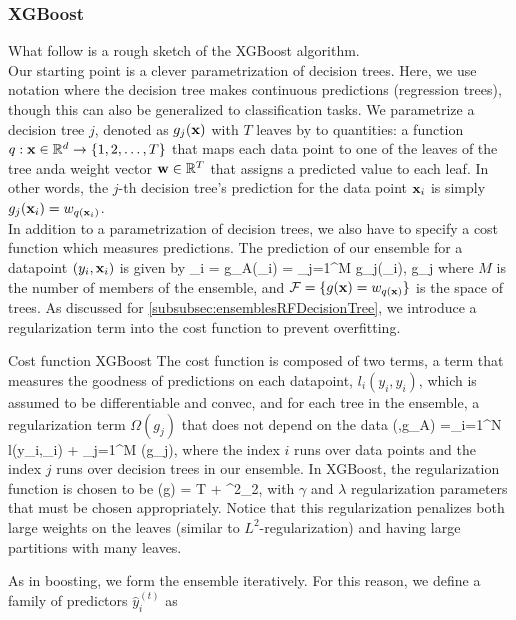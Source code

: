 \subsubsection{XGBoost}
\label{subsubsec:ensemblesXGBoost}
What follow is a rough sketch of the XGBoost algorithm.\\
Our starting point is a clever parametrization of decision trees. Here, we use notation where the decision tree makes continuous predictions (regression trees), though this can also be generalized to classification tasks. We parametrize a decision tree $j$, denoted as $g_j(\mathbf{x})$ with $T$ leaves by to quantities: a function $q: \mathbf{x} \in \mathbb{R}^d \rightarrow \{1,2,\dots, T\}$ that maps each data point to one of the leaves of the tree anda weight vector $\mathbf{w} \in \mathbb{R}^T$ that assigns a predicted value to each leaf. In other words, the $j$-th decision tree's prediction for the data point $\mathbf{x}_i$ is simply $g_j(\mathbf{x}_i) = w_{q(\mathbf{x}_i)}$.\\
In addition to a parametrization of decision trees, we also have to specify a cost function which measures predictions. The prediction of our ensemble for a datapoint $(y_i,\mathbf{x}_i)$ is given by
\bse 
{}_i = g_A(\mx_i) = \sum_{j=1}^M g_j(\mx_i), \quad g_j \in {} 
\ese 
where $M$ is the number of members of the ensemble, and $\mathcal{F}=\{g(\mathbf{x}) = w_{q(\mathbf{x})} \}$ is the space of trees. As discussed for \ref{subsubsec:ensemblesRFDecisionTree}, we introduce a regularization term into the cost function to prevent overfitting.
\begin{mybox}{Cost function XGBoost}
	The cost function is composed of two terms, a term that measures the goodness of predictions on each datapoint, $l_i(y_i,\hat{y}_i)$, which is assumed to be differentiable and convec, and for each tree in the ensemble, a regularization term $\Omega(g_j)$ that does not depend on the data 
	\be 
	\label{eq:ensemblesXGBoostCostfct}
	\mC (\mX,g_A) =\sum_{i=1}^N l(y_i,_i) + \sum_{j=1}^M \Omega(g_j),
	\ee 
	where the index $i$ runs over data points and the index $j$ runs over decision trees in our ensemble. In XGBoost, the regularization function is chosen to be
	\be 
	\Omega(g) = \gamma T + \norm{\mw}^2_2,
	\ee 
	with $\gamma$ and $\lambda$ regularization parameters that must be chosen appropriately. Notice that this regularization penalizes both large weights on the leaves (similar to $L^2$-regularization) and having large partitions with many leaves.
\end{mybox}
As in boosting, we form the ensemble iteratively. For this reason, we define a family of predictors $\hat{y}^{(t)}_i$ as 
